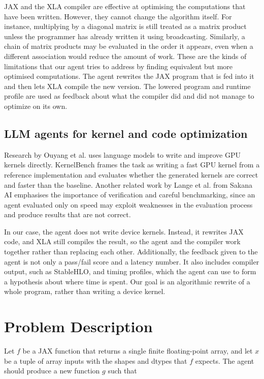 \documentclass[conference]{IEEEtran}
\begin{document}
JAX and the XLA compiler are effective at optimising the computations that have been written. However, they cannot change the algorithm itself. For instance, multiplying by a diagonal matrix is still treated as a matrix product unless the programmer has already written it using broadcasting. Similarly, a chain of matrix products may be evaluated in the order it appears, even when a different association would reduce the amount of work. These are the kinds of limitations that our agent tries to address by finding equivalent but more optimised computations. The agent rewrites the JAX program that is fed into it and then lets XLA compile the new version. The lowered program and runtime profile are used as feedback about what the compiler did and did not manage to optimize on its own.


\subsection{LLM agents for kernel and code optimization}
Research by Ouyang et al. \cite{ouyang2025kernelbench} uses language models to write and improve GPU kernels directly. KernelBench frames the task as writing a fast GPU kernel from a reference implementation and evaluates whether the generated kernels are correct and faster than the baseline. Another related work by Lange et al. from Sakana AI \cite{lange2025robust} emphasises the importance of verification and careful benchmarking, since an agent evaluated only on speed may exploit weaknesses in the evaluation process and produce results that are not correct.

In our case, the agent does not write device kernels. Instead, it rewrites JAX code, and XLA still compiles the result, so the agent and the compiler work together rather than replacing each other. Additionally, the feedback given to the agent is not only a pass/fail score and a latency number. It also includes compiler output, such as StableHLO, and timing profiles, which the agent can use to form a hypothesis about where time is spent. Our goal is an algorithmic rewrite of a whole program, rather than writing a device kernel.

\section{Problem Description}
Let \(f\) be a JAX function that returns a single finite floating-point array, and let \(x\) be a tuple of array inputs with the shapes and dtypes that \(f\) expects. The agent should produce a new function \(g\) such that
\end{document}

